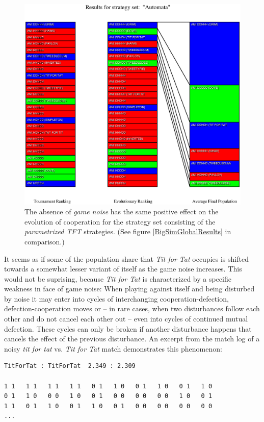 \begin{figure}
\begin{center}
\includegraphics[width=20cm]{images/NoGameNoiseAM.eps} %
\caption{\label{NoGameNoiseTFT} The absence of {\em game noise} has
  the same positive effect on the evolution of cooperation for the
  strategy set consisting of the {\em parametrized TFT} strategies.
  (See figure \ref{BigSimGlobalResults} in comparison.)}
\end{center}
\end{figure}

It seems as if some of the population share that {\em Tit for Tat} occupies is
shifted towards a somewhat lesser variant of itself as the game noise
increases. This would not be suprising, because {\em Tit for Tat} is
characterized by a specific weakness in face of game noise: When playing
against itself and being disturbed by noise it may enter into cycles of
interchanging cooperation-defection, defection-cooperation moves or -- in
rare cases, when two disturbances follow each other and do not cancel each
other out -- even into cycles of continued mutual defection. These cycles can
only be broken if another disturbance happens that cancels the effect of the
previous disturbance. An excerpt from the match log of a noisy {\em tit for
  tat} vs. {\em Tit for Tat} match demonstrates this phenomenon:

\begin{verbatim}
TitForTat : TitForTat  2.349 : 2.309

1 1   1 1   1 1   1 1   0 1   1 0   0 1   1 0   0 1   1 0
0 1   1 0   0 0   1 0   0 1   0 0   0 0   0 0   1 0   0 1
1 1   0 1   1 0   0 1   1 0   0 1   0 0   0 0   0 0   0 0
...
\end{verbatim}

